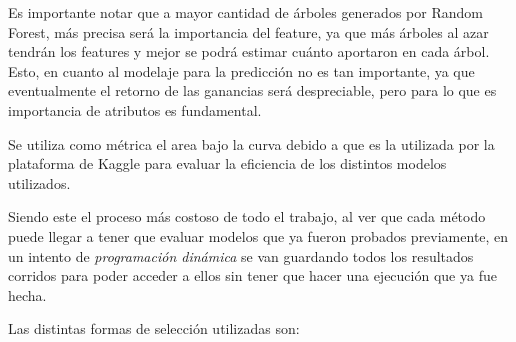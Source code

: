 \documentclass[a4paper]{article}
\begin{document}
Es importante notar que a mayor cantidad de árboles generados por Random Forest, más precisa será la importancia del feature, ya que más árboles al azar tendrán los features y mejor se podrá estimar cuánto aportaron en cada árbol. Esto, en cuanto al modelaje para la predicción no es tan importante, ya que eventualmente el retorno de las ganancias será despreciable, pero para lo que es importancia de atributos es fundamental.

Se utiliza como métrica el area bajo la curva debido a que es la utilizada por la plataforma de Kaggle para evaluar la eficiencia de los distintos modelos utilizados. 

Siendo este el proceso más costoso de todo el trabajo, al ver que cada método puede llegar a tener que evaluar modelos que ya fueron probados previamente, en un intento de \textit{programación dinámica} se van guardando todos los resultados corridos para poder acceder a ellos sin tener que hacer una ejecución que ya fue hecha.

Las distintas formas de selección utilizadas son:
\end{document}
